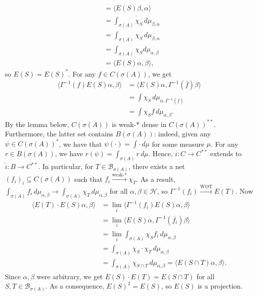 \begin{myproof}
\begin{align*}
    &= \overline{\langle E(S) \beta, \alpha \rangle}\\
    &= \overline{\int_{\sigma(A)} \chi_S\, d\mu_{\beta, \alpha}}\\
    &= \int_{\sigma(A)} \chi_S\, d\overline{\mu_{\beta, \alpha}}\\
    &= \int_{\sigma(A)} \chi_S d\mu_{\alpha, \beta}\\
    &= \langle E(S) \alpha, \beta\rangle,
  \end{align*}
  so $E(S) = E(S)^*$.
  For any $f \in C(\sigma(A))$, we get 
  \begin{align*}
    \langle \Gamma^{-1} (f) E(S) \alpha, \beta \rangle &= \langle E(S) \alpha, \Gamma^{-1}(\overline{f})\beta\rangle\\
    &= \int \chi_S\, d\mu_{\alpha, \Gamma^{-1} (\overline{f})}\\
    &= \int \chi_S f\, d\mu_{\alpha, \beta}.
  \end{align*}
  By the lemma below, $C(\sigma(A))$ is weak-* dense in $C(\sigma(A))^{**}$.
  Furthermore, the latter set contains $B(\sigma(A))$: indeed, given any $\psi \in C(\sigma(A))^*$,
  we have that $\psi (\cdot) = \int \cdot \, d\mu$ for some measure $\mu$.
  For any $r \in B(\sigma(A))$, we have $r(\psi) = \int_{\sigma(A)} r\, d\mu$.
  Hence, $i: C \to C^{**}$ extends to $\widehat{i}: B \to C^{**}$.
  In particular, for $T \in \mathcal{B}_{\sigma(A)}$, there exists a net $(f_i)_i \subseteq C(\sigma(A))$
  such that $f_i \xrightarrow{\textrm{weak-*}} \chi_T$. As a result,
  $\int_{\sigma(A)} f_i\, d\mu_{\alpha, \beta} \to \int_{\sigma(A)} \chi_T \, d\mu_{\alpha, \beta}$ for all $\alpha, \beta \in \mathcal{H}$,
  so $\Gamma^{-1} (f_i) \xrightarrow{\textrm{WOT}} E(T)$. Now 
  \begin{align*}
    \langle E(T) \cdot E(S) \alpha, \beta\rangle &= \lim_{i} \langle \Gamma^{-1} (f_i) E(S)\alpha, \beta\rangle\\
    &= \lim_i \langle E(S) \alpha, \Gamma^{-1} (\overline{f_i})\beta \rangle\\
    &= \lim_i \int_{\sigma(A)} \chi_S f_i\, d\mu_{\alpha, \beta}\\
    &= \int_{\sigma(A)} \chi_S \cdot \chi_T\, d\mu_{\alpha, \beta}\\
    &= \int_{\sigma(A)} \chi_{S \cap T}\, d\mu_{\alpha, \beta} = \langle E(S \cap T) \alpha, \beta\rangle.
  \end{align*}
  Since $\alpha, \beta$ were arbitrary, we get $E(S) \cdot E(T) = E(S \cap T)$ for all $S, T \in \mathcal{B}_{\sigma(A)}$.
  As a consequence, $E(S)^2 = E(S)$, so $E(S)$ is a projection.

\end{myproof}
